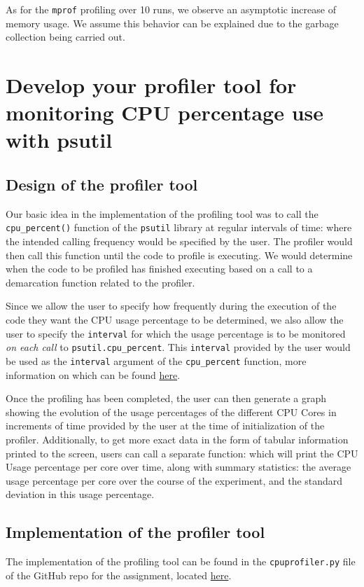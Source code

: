 \documentclass[a4paper,12pt]{article}
\begin{document}
As for the \verb|mprof| profiling over 10 runs, we observe an asymptotic increase of memory usage. 
We assume this behavior can be explained due to the garbage collection being carried out.

\newpage
\section{Develop your profiler tool for monitoring CPU percentage use with psutil}
\subsection{Design of the profiler tool}
Our basic idea in the implementation of the profiling tool was to call the \verb|cpu_percent()| function of the \verb|psutil| library at regular intervals of time: where the intended calling frequency would be specified by the user. The profiler would then call this function until the code to profile is executing. We would determine when the code to be profiled has finished executing based on a call to a demarcation function related to the profiler. 

Since we allow the user to specify how frequently during the execution of the code they want the CPU usage percentage to be determined, we also allow the user to specify the \verb|interval| for which the usage percentage is to be monitored \textit{on each call} to \verb|psutil.cpu_percent|. This \verb|interval| provided by the user would be used as the \verb|interval| argument of the \verb|cpu_percent| function, more information on which can be found \href{https://psutil.readthedocs.io/en/latest/#psutil.cpu_percent}{here}.

Once the profiling has been completed, the user can then generate a graph showing the evolution of the usage percentages of the different CPU Cores in increments of time provided by the user at the time of initialization of the profiler. Additionally, to get more exact data in the form of tabular information printed to the screen, users can call a separate function: which will print the CPU Usage percentage per core over time, along with summary statistics: the average usage percentage per core over the course of the experiment, and the standard deviation in this usage percentage.

\subsection{Implementation of the profiler tool}
The implementation of the profiling tool can be found in the \verb|cpuprofiler.py| file of the GitHub repo for the assignment, located \href{https://github.com/paulmyr/DD2358-HPC25/blob/master/01_profiling/cpuprofiler.py}{here}. 
\end{document}
